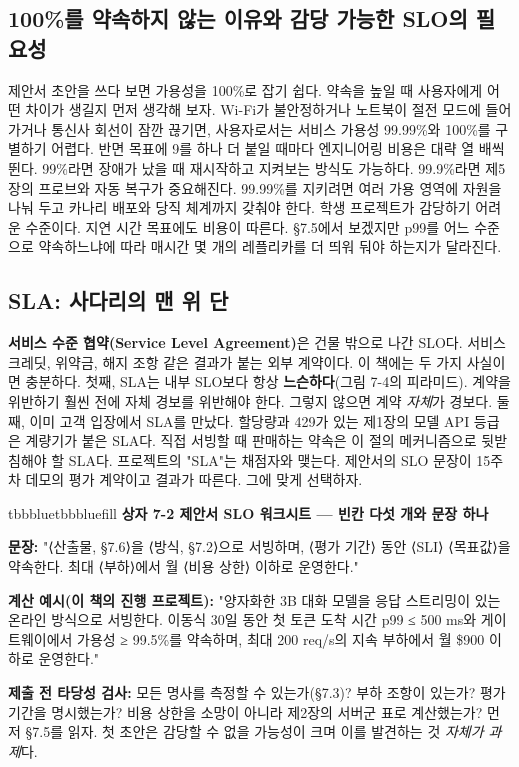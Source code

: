 \subsection*{100\%를 약속하지 않는 이유와 감당 가능한 SLO의 필요성}

제안서 초안을 쓰다 보면 가용성을 100\%로 잡기 쉽다. 약속을 높일 때 사용자에게 어떤 차이가 생길지 먼저 생각해 보자. Wi-Fi가 불안정하거나 노트북이 절전 모드에 들어가거나 통신사 회선이 잠깐 끊기면, 사용자로서는 서비스 가용성 99.99\%와 100\%를 구별하기 어렵다. 반면 목표에 9를 하나 더 붙일 때마다 엔지니어링 비용은 대략 열 배씩 뛴다. 99\%라면 장애가 났을 때 재시작하고 지켜보는 방식도 가능하다. 99.9\%라면 제5장의 프로브와 자동 복구가 중요해진다. 99.99\%를 지키려면 여러 가용 영역에 자원을 나눠 두고 카나리 배포와 당직 체계까지 갖춰야 한다. 학생 프로젝트가 감당하기 어려운 수준이다. 지연 시간 목표에도 비용이 따른다. §7.5에서 보겠지만 p99를 어느 수준으로 약속하느냐에 따라 매시간 몇 개의 레플리카를 더 띄워 둬야 하는지가 달라진다.

\subsection*{SLA: 사다리의 맨 위 단}

\textbf{서비스 수준 협약(Service Level Agreement)}은 건물 밖으로 나간 SLO다. 서비스 크레딧, 위약금, 해지 조항 같은 결과가 붙는 외부 계약이다. 이 책에는 두 가지 사실이면 충분하다. 첫째, SLA는 내부 SLO보다 항상 \textbf{느슨하다}(그림 7-4의 피라미드). 계약을 위반하기 훨씬 전에 자체 경보를 위반해야 한다. 그렇지 않으면 계약 \textit{자체}가 경보다. 둘째, 이미 고객 입장에서 SLA를 만났다. 할당량과 429가 있는 제1장의 모델 API 등급은 계량기가 붙은 SLA다. 직접 서빙할 때 판매하는 약속은 이 절의 메커니즘으로 뒷받침해야 할 SLA다. 프로젝트의 "SLA"는 채점자와 맺는다. 제안서의 SLO 문장이 15주 차 데모의 평가 계약이고 결과가 따른다. 그에 맞게 선택하자.

\begin{calloutbox}{tbbblue}{tbbbluefill}
{\normalsize\bfseries\color{tbbblue}상자 7-2  제안서 SLO 워크시트 — 빈칸 다섯 개와 문장 하나}\par\vspace{3pt}
\textbf{문장:} "⟨산출물, §7.6⟩을 ⟨방식, §7.2⟩으로 서빙하며, ⟨평가 기간⟩ 동안 ⟨SLI⟩ ⟨목표값⟩을 약속한다. 최대 ⟨부하⟩에서 월 ⟨비용 상한⟩ 이하로 운영한다."

\textbf{계산 예시(이 책의 진행 프로젝트):} "양자화한 3B 대화 모델을 응답 스트리밍이 있는 온라인 방식으로 서빙한다. 이동식 30일 동안 첫 토큰 도착 시간 p99 ≤ 500 ms와 게이트웨이에서 가용성 ≥ 99.5\%를 약속하며, 최대 200 req/s의 지속 부하에서 월 \$900 이하로 운영한다."

\textbf{제출 전 타당성 검사:} 모든 명사를 측정할 수 있는가(§7.3)? 부하 조항이 있는가? 평가 기간을 명시했는가? 비용 상한을 소망이 아니라 제2장의 서버군 표로 계산했는가? 먼저 §7.5를 읽자. 첫 초안은 감당할 수 없을 가능성이 크며 이를 발견하는 것 \textit{자체가 과제}다.
\end{calloutbox}

